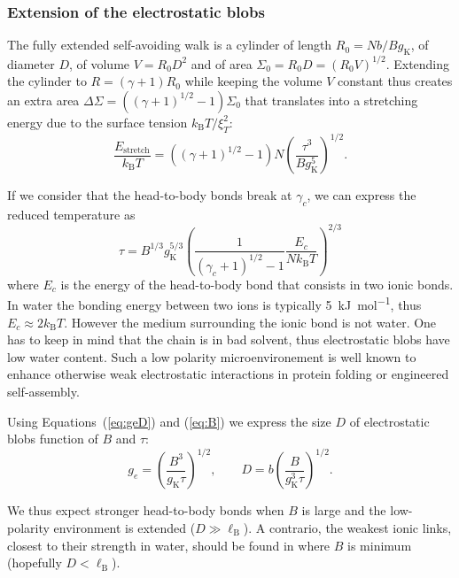 \documentclass[journal=jacsat,manuscript=article]{achemso}
\begin{document}
\subsubsection{Extension of the electrostatic blobs}

The fully extended self-avoiding walk is a cylinder of length $R_0 = Nb/Bg_\mathrm{K}$, of diameter $D$, of volume $V = R_0 D^2$ and of area $\Sigma_0 = R_0 D = (R_0 V)^{1/2}$. Extending the cylinder to $R = (\gamma+1) R_0$ while keeping the volume $V$ constant thus creates an extra area 
$
\Delta\Sigma = \left(\left(\gamma +1\right)^{1/2} -1\right) \Sigma_0
$
that translates into a stretching energy due to the surface tension $k_\mathrm{B}T/\xi_T^2$:
\begin{equation}
\frac{E_\mathrm{stretch}}{k_\mathrm{B}T} = \left(\left(\gamma +1\right)^{1/2} -1\right) N \left(\frac{\tau^3}{B g_\mathrm{K}^5}\right)^{1/2}.
\label{eq:stretch}
\end{equation}

If we consider that the head-to-body bonds break at $\gamma_c$, we can express the reduced temperature as
\begin{equation}
\tau = B^{1/3} g_\mathrm{K}^{5/3} \left(\frac{1}{(\gamma_c +1)^{1/2} -1}\frac{E_c}{N k_\mathrm{B}T}\right)^{2/3}
\label{eq:tau}
\end{equation}
where $E_c$ is the energy of the head-to-body bond that consists in two ionic bonds. In water the bonding energy between two ions is typically \SI{5}{\kilo\joule\per\mole}\cite{Schneider1992}, thus $E_c\approx 2 k_\mathrm{B}T$. However the medium surrounding the ionic bond is not water. One has to keep in mind that the chain is in bad solvent, thus electrostatic blobs have low water content. Such a low polarity microenvironement is well known to enhance otherwise weak electrostatic interactions in protein folding or engineered self-assembly\cite{Rehm2010}. 

Using Equations~(\ref{eq:geD}) and (\ref{eq:B}) we express the size $D$ of electrostatic blobs function of $B$ and $\tau$:
\begin{equation}
g_e = \left(\frac{B^3}{g_\mathrm{K}\tau}\right)^{1/2},\qquad 
D = b\left(\frac{B}{g_\mathrm{K}^3\tau}\right)^{1/2}.
\label{eq:DB}
\end{equation}

We thus expect stronger head-to-body bonds when $B$ is large and the low-polarity environment is extended ($D\gg\ell_\mathrm{B}$). A contrario, the weakest ionic links, closest to their strength in water, should be found in  where $B$ is minimum (hopefully $D<\ell_\mathrm{B}$).
\end{document}
